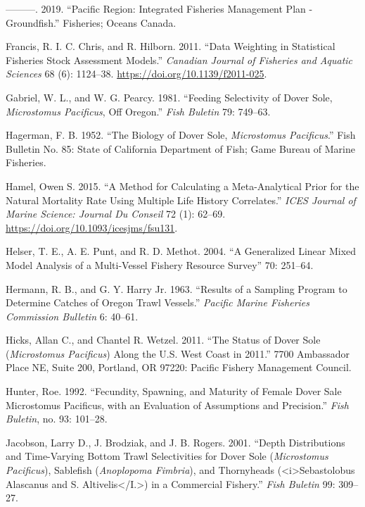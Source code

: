 \documentclass[11pt,
  english,
  a4paper,
]{article}
\begin{document}
\begin{cslreferences}
\leavevmode\hypertarget{ref-department_of_fisheries_and_ocean_pacific_2019}{}%
---------. 2019. ``Pacific Region: Integrated Fisheries Management Plan - Groundfish.'' Fisheries; Oceans Canada.

\leavevmode\hypertarget{ref-francis_data_2011}{}%
Francis, R. I. C. Chris, and R. Hilborn. 2011. ``Data Weighting in Statistical Fisheries Stock Assessment Models.'' \emph{Canadian Journal of Fisheries and Aquatic Sciences} 68 (6): 1124--38. \url{https://doi.org/10.1139/f2011-025}.

\leavevmode\hypertarget{ref-gabriel_feeding_1981}{}%
Gabriel, W. L., and W. G. Pearcy. 1981. ``Feeding Selectivity of Dover Sole, \emph{Microstomus Pacificus}, Off Oregon.'' \emph{Fish Buletin} 79: 749--63.

\leavevmode\hypertarget{ref-hagerman_biology_1952}{}%
Hagerman, F. B. 1952. ``The Biology of Dover Sole, \emph{Microstomus Pacificus}.'' Fish Bulletin No. 85: State of California Department of Fish; Game Bureau of Marine Fisheries.

\leavevmode\hypertarget{ref-hamel_method_2015}{}%
Hamel, Owen S. 2015. ``A Method for Calculating a Meta-Analytical Prior for the Natural Mortality Rate Using Multiple Life History Correlates.'' \emph{ICES Journal of Marine Science: Journal Du Conseil} 72 (1): 62--69. \url{https://doi.org/10.1093/icesjms/fsu131}.

\leavevmode\hypertarget{ref-helser_generalized_2004}{}%
Helser, T. E., A. E. Punt, and R. D. Methot. 2004. ``A Generalized Linear Mixed Model Analysis of a Multi-Vessel Fishery Resource Survey'' 70: 251--64.

\leavevmode\hypertarget{ref-hermann_results_1963}{}%
Hermann, R. B., and G. Y. Harry Jr. 1963. ``Results of a Sampling Program to Determine Catches of Oregon Trawl Vessels.'' \emph{Pacific Marine Fisheries Commission Bulletin} 6: 40--61.

\leavevmode\hypertarget{ref-hicks_status_2011}{}%
Hicks, Allan C., and Chantel R. Wetzel. 2011. ``The Status of Dover Sole (\emph{Microstomus Pacificus}) Along the U.S. West Coast in 2011.'' 7700 Ambassador Place NE, Suite 200, Portland, OR 97220: Pacific Fishery Management Council.

\leavevmode\hypertarget{ref-hunter_fecundity_1992}{}%
Hunter, Roe. 1992. ``Fecundity, Spawning, and Maturity of Female Dover Sale Microstomus Pacificus, with an Evaluation of Assumptions and Precision.'' \emph{Fish Buletin}, no. 93: 101--28.

\leavevmode\hypertarget{ref-jacobson_depth_2001}{}%
Jacobson, Larry D., J. Brodziak, and J. B. Rogers. 2001. ``Depth Distributions and Time-Varying Bottom Trawl Selectivities for Dover Sole (\emph{Microstomus Pacificus}), Sablefish (\emph{Anoplopoma Fimbria}), and Thornyheads (\textless i\textgreater Sebastolobus Alascanus and S. Altivelis\textless/I.\textgreater) in a Commercial Fishery.'' \emph{Fish Buletin} 99: 309--27.


\end{cslreferences}
\end{document}
